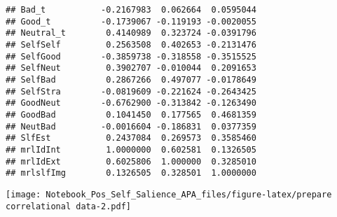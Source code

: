 \documentclass[man]{apa6}
\begin{document}
\begin{verbatim}
## Bad_t           -0.2167983  0.062664  0.0595044
## Good_t          -0.1739067 -0.119193 -0.0020055
## Neutral_t        0.4140989  0.323724 -0.0391796
## SelfSelf         0.2563508  0.402653 -0.2131476
## SelfGood        -0.3859738 -0.318558 -0.3515525
## SelfNeut         0.3902707 -0.010044  0.2091653
## SelfBad          0.2867266  0.497077 -0.0178649
## SelfStra        -0.0819609 -0.221624 -0.2643425
## GoodNeut        -0.6762900 -0.313842 -0.1263490
## GoodBad          0.1041450  0.177565  0.4681359
## NeutBad         -0.0016604 -0.186831  0.0377359
## SlfEst           0.2437084  0.269573  0.3585460
## mrlIdInt         1.0000000  0.602581  0.1326505
## mrlIdExt         0.6025806  1.000000  0.3285010
## mrlslfImg        0.1326505  0.328501  1.0000000
\end{verbatim}

\texttt{[image: Notebook\_Pos\_Self\_Salience\_APA\_files/figure-latex/prepare correlational data-2.pdf]}
\end{document}
